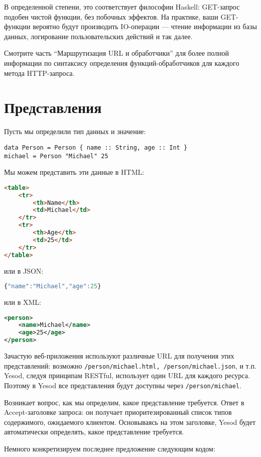 В определенной степени, это соответствует философии Haskell: GET-запрос подобен чистой функции, без побочных эффектов. На практике, ваши GET-функции вероятно будут производить IO-операции --- чтение информации из базы данных, логирование пользовательских действий и так далее.

Смотрите часть “Маршрутизация URL и обработчики” для более полной информации по синтаксису определения функций-обработчиков для каждого метода HTTP-запроса.

\section{Представления}

Пусть мы определили тип данных и значение:

\begin{lstlisting}
data Person = Person { name :: String, age :: Int }
michael = Person "Michael" 25
\end{lstlisting}

Мы можем представить эти данные в HTML:
\begin{lstlisting}[language=HTML]
 <table>
    <tr>
        <th>Name</th>
        <td>Michael</td>
    </tr>
    <tr>
        <th>Age</th>
        <td>25</td>
    </tr>
</table>
\end{lstlisting}

или в JSON:

\begin{lstlisting}[language=JavaScript]
{"name":"Michael","age":25}
\end{lstlisting}

или в XML:
\begin{lstlisting}[language=XML]
<person>
    <name>Michael</name>
    <age>25</age>
</person>
\end{lstlisting}

Зачастую веб-приложения используют различные URL для получения этих представлений: возможно \lstinline'/person/michael.html, /person/michael.json', и т.п. Yesod, следуя принципам RESTful, использует один URL для каждого ресурса. Поэтому в Yesod все представления будут доступны через \lstinline'/person/michael'.

Возникает вопрос, как мы определим, какое представление требуется. Ответ в Accept-заголовке запроса: он получает приоритезированный список типов содержимого, ожидаемого клиентом. Основываясь на этом заголовке, Yesod будет автоматически определять, какое представление требуется.

Немного конкретизируем последнее предложение следующим кодом:

